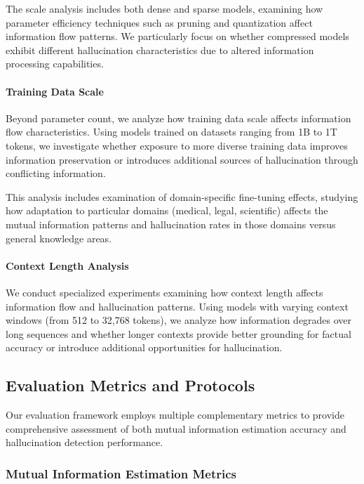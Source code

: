 The scale analysis includes both dense and sparse models, examining how parameter efficiency techniques such as pruning and quantization affect information flow patterns. We particularly focus on whether compressed models exhibit different hallucination characteristics due to altered information processing capabilities.

\paragraph{Training Data Scale}
Beyond parameter count, we analyze how training data scale affects information flow characteristics. Using models trained on datasets ranging from 1B to 1T tokens, we investigate whether exposure to more diverse training data improves information preservation or introduces additional sources of hallucination through conflicting information.

This analysis includes examination of domain-specific fine-tuning effects, studying how adaptation to particular domains (medical, legal, scientific) affects the mutual information patterns and hallucination rates in those domains versus general knowledge areas.

\paragraph{Context Length Analysis}
We conduct specialized experiments examining how context length affects information flow and hallucination patterns. Using models with varying context windows (from 512 to 32,768 tokens), we analyze how information degrades over long sequences and whether longer contexts provide better grounding for factual accuracy or introduce additional opportunities for hallucination.

\subsection{Evaluation Metrics and Protocols}
\label{subsec:evaluation_metrics}

Our evaluation framework employs multiple complementary metrics to provide comprehensive assessment of both mutual information estimation accuracy and hallucination detection performance.

\subsubsection{Mutual Information Estimation Metrics}


